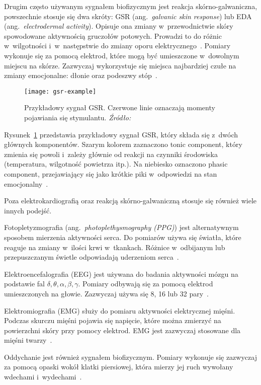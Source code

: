 Drugim często używanym sygnałem biofizycznym jest reakcja skórno-galwaniczna, powszechnie stosuje się dwa skróty: GSR (ang.~\textit{galvanic skin response}) lub EDA (ang.~\textit{electrodermal activity}).
Opisuje ona zmiany w~przewodnictwie skóry spowodowane aktywnością gruczołów potowych.
Prowadzi to do różnic w~wilgotności i~w~następstwie do zmiany oporu elektrycznego~\cite{Dzedzickis2020}.
Pomiary wykonuje się za pomocą elektrod, które mogą być umieszczone w~dowolnym miejscu na skórze.
Zazwyczaj wykorzystuje się miejsca najbardziej czułe na zmiany emocjonalne: dłonie oraz podeszwy stóp~\cite{Calvo2015}.

\begin{figure}[h]
    \centering
    \texttt{[image: gsr-example]}
    \caption{Przykładowy sygnał GSR. Czerwone linie oznaczają momenty pojawiania się stymulantu. \textit{Źródło:~\cite{Dzedzickis2020}}}
    \label{fig:gsr-example}
\end{figure}

Rysunek~\ref{fig:gsr-example} przedstawia przykładowy sygnał GSR, który składa się z~dwóch głównych komponentów.
Szarym kolorem zaznaczono tonic component, który zmienia się powoli i~zależy głównie od reakcji na czynniki środowiska (temperatura, wilgotność powietrza itp.).
Na niebiesko oznaczono phasic component, przejawiający się jako krótkie piki w~odpowiedzi na stan emocjonalny~\cite{Dzedzickis2020}.

Poza elektrokardiografią oraz reakcją skórno-galwaniczną stosuje się również wiele innych podejść.

Fotopletyzmografia (ang.~\textit{photoplethysmography (PPG)}) jest alternatywnym sposobem mierzenia aktywności serca.
Do pomiarów używa się światła, które reaguje na zmiany w~ilości krwi w~tkankach.
Różnice w~odbijanym lub przepuszczanym świetle odpowiadają uderzeniom serca~\cite{Dzedzickis2020}.

Elektroencefalografia (EEG) jest używana do badania aktywności mózgu na podstawie fal \(\delta, \theta, \alpha, \beta, \gamma\).
Pomiary odbywają się za pomocą elektrod umieszczonych na głowie.
Zazwyczaj używa się 8, 16 lub 32 pary~\cite{Dzedzickis2020}.

Elektromiografia (EMG) służy do pomiaru aktywności elektrycznej mięśni.
Podczas skurczu mięśni pojawia się napięcie, które można zmierzyć na powierzchni skóry przy pomocy elektrod.
EMG jest zazwyczaj stosowane dla mięśni twarzy~\cite{Dzedzickis2020}.

Oddychanie jest również sygnałem biofizycznym.
Pomiary wykonuje się zazwyczaj za pomocą opaski wokół klatki piersiowej, która mierzy jej ruch wywołany wdechami i~wydechami~\cite{Dzedzickis2020}.

